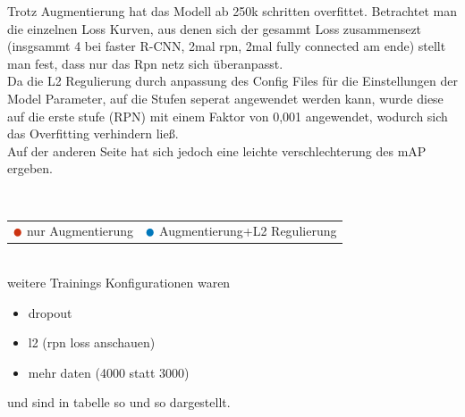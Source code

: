 Trotz Augmentierung hat das Modell ab 250k schritten overfittet.
Betrachtet man die einzelnen Loss Kurven, aus denen sich der gesammt 
Loss zusammensezt (insgsammt 4 bei faster R-CNN, 2mal rpn, 2mal fully connected am ende)
stellt man fest, dass nur das Rpn netz sich überanpasst.
\\
Da die L2 Regulierung durch anpassung des Config Files für die 
Einstellungen der Model Parameter, auf die Stufen seperat angewendet werden 
kann, wurde diese auf die erste stufe (RPN) mit einem Faktor von 0,001 
angewendet, wodurch sich das Overfitting verhindern ließ.
\\
Auf der anderen Seite hat sich jedoch eine leichte verschlechterung
des mAP ergeben.
\\[1cm]
\begin{minipage}{0.5\textwidth}
  \centering
  \def\svgwidth{0.9\textwidth}
  
  \label{}
\end{minipage}
\begin{minipage}{0.5\textwidth}
  \centering
  \def\svgwidth{0.9\textwidth}
  
  \label{}
\end{minipage}
\\[1cm]
\begin{minipage}{0.5\textwidth}
  \centering
  \def\svgwidth{0.9\textwidth}
  
  \label{}
\end{minipage}
\begin{minipage}{0.5\textwidth}
  \centering
  \def\svgwidth{0.9\textwidth}
  
  \label{}
\end{minipage}
\begin{table}[htb]
  \centering
  \begin{tabular}{m{}<{\centering}m{}<{\centering}}
    $\color[HTML]{CC3311}\medbullet$  nur Augmentierung & $\color[HTML]{0077BB}\medbullet$  Augmentierung+L2 Regulierung
  \end{tabular}    
\end{table}
\\[1cm]
weitere Trainings Konfigurationen waren
\begin{itemize}
  \item dropout
  \item l2 (rpn loss anschauen)
  \item mehr daten (4000 statt 3000)
\end{itemize}
und sind in tabelle so und so dargestellt.

